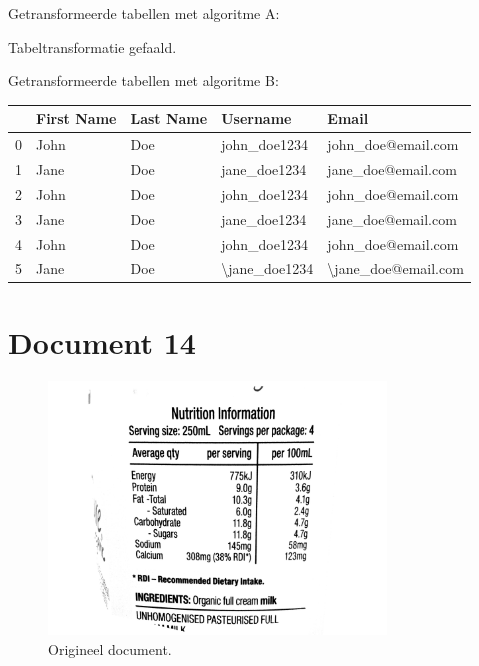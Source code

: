 Getransformeerde tabellen met algoritme A:

Tabeltransformatie gefaald.

Getransformeerde tabellen met algoritme B:

\begin{tabular}{lllll}
\toprule
{} & First Name & Last Name &       Username &                Email \\
\midrule
0 &       John &       Doe &   john\_doe1234 &   john\_doe@email.com \\
1 &       Jane &       Doe &   jane\_doe1234 &   jane\_doe@email.com \\
2 &       John &       Doe &   john\_doe1234 &   john\_doe@email.com \\
3 &       Jane &       Doe &   jane\_doe1234 &   jane\_doe@email.com \\
4 &       John &       Doe &   john\_doe1234 &   john\_doe@email.com \\
5 &       Jane &       Doe &  \textbackslash jane\_doe1234 &  \textbackslash jane\_doe@email.com \\
\bottomrule
\end{tabular}

\section{Document 14}

\begin{figure}[H]
    \centering
    \includegraphics[width=0.8\textwidth]{test-resultaten/14/original_b/original.png}
    \caption{Origineel document.}
\end{figure}

